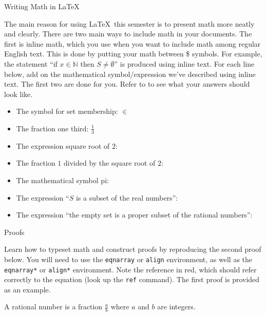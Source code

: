\documentclass[10pt]{article}
\begin{document}
\thispagestyle{empty}
\handout




\begin{problem} Writing Math in \LaTeX \end{problem}

The main reason for using \LaTeX\ this semester is to present math more neatly and clearly. There are two main ways to include math in your documents. The first is inline math, which you use when you want to include math among regular English text. This is done by putting your math between \$ symbols. For example, the statement ``if $x\in \mathbb{N}$ then $S\neq \emptyset$'' is produced using inline text. For each line below, add on the mathematical symbol/expression we've described using inline text. The first two are done for you. Refer to  to see what your answers should look like.

\begin{itemize}
    \item The symbol for set membership: $\in$
    \item The fraction one third: $\frac{1}{3}$
    \item The expression square root of $2$:
    \item The fraction $1$ divided by the square root of $2$:
    \item The mathematical symbol pi:
    \item The expression ``$S$ is a subset of the real numbers'':
    \item The expression ``the empty set is a proper subset of the rational numbers'':
\end{itemize}
\break
\begin{problem} Proofs \end{problem}

Learn how to typeset math and construct proofs by reproducing the second proof below. You will need to use the \verb|eqnarray| or \verb|align| environment, as well as the \verb|eqnarray*| or \verb|align*| environment.  Note the reference in red, which should refer correctly to the equation (look up the \verb|ref| command).  The first proof is provided as an example.

\begin{definition}
    \label{def1}
A rational number is a fraction $\frac{a}{b}$ where $a$ and $b$ are integers. 
\end{definition}
\end{document}
